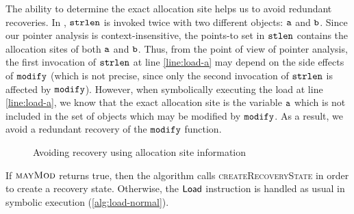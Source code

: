 The ability to determine the exact allocation site helps us to avoid redundant recoveries.
In , $\texttt{strlen}$ is invoked twice
with two different objects: $\texttt{a}$ and $\texttt{b}$.
Since our pointer analysis is context-insensitive,
the points-to set in $\texttt{stlen}$ contains the allocation sites of both $\texttt{a}$ and $\texttt{b}$.
Thus, from the point of view of pointer analysis,
the first invocation of $\texttt{strlen}$ at line \ref{line:load-a}
may depend on the side effects of $\texttt{modify}$
(which is not precise, since only the second invocation of $\texttt{strlen}$ is affected by $\texttt{modify}$).
However, when symbolically executing the load at line \ref{line:load-a},
we know that the exact allocation site is the variable $\texttt{a}$
which is not included in the set of objects which may be modified by $\texttt{modify}$.
As a result, we avoid a redundant recovery of the $\texttt{modify}$ function.

\begin{figure}
  \centering
    
    \label{fig:dependent-load}
  \caption{Avoiding recovery using allocation site information}
  \label{fig:simpe-dependent-load}
\end{figure}

If $\textsc{mayMod}$ returns true,
then the algorithm calls \textsc{createRecoveryState} in order to create a recovery state.
Otherwise, the $\mathsf{Load}$ instruction is handled as usual in symbolic execution (\cref{alg:load-normal}).


